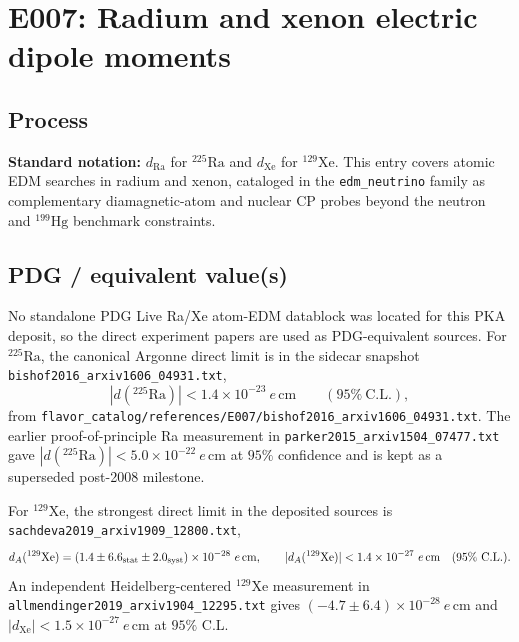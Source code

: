 
\section{E007: Radium and xenon electric dipole moments}

\subsection*{Process}
\textbf{Standard notation:} \(d_{\mathrm{Ra}}\) for
\(^{225}\mathrm{Ra}\) and \(d_{\mathrm{Xe}}\) for
\(^{129}\mathrm{Xe}\).  This entry covers atomic EDM searches in radium and
xenon, cataloged in the \texttt{edm\_neutrino} family as complementary
diamagnetic-atom and nuclear CP probes beyond the neutron and
\(^{199}\mathrm{Hg}\) benchmark constraints.

\subsection*{PDG / equivalent value(s)}
No standalone PDG Live Ra/Xe atom-EDM datablock was located for this PKA
deposit, so the direct experiment papers are used as PDG-equivalent sources.
For \(^{225}\mathrm{Ra}\), the canonical Argonne direct limit is in the
sidecar snapshot \texttt{bishof2016\_arxiv1606\_04931.txt},
\[
  |d(^{225}\mathrm{Ra})| < 1.4\times10^{-23}\ e\,\mathrm{cm}
  \qquad (95\%~\mathrm{C.L.}),
\]
from \texttt{flavor\_catalog/references/E007/bishof2016\_arxiv1606\_04931.txt}.
The earlier proof-of-principle Ra measurement in
\texttt{parker2015\_arxiv1504\_07477.txt} gave
\(|d(^{225}\mathrm{Ra})|<5.0\times10^{-22}\ e\,\mathrm{cm}\) at
\(95\%\) confidence and is kept as a superseded post-2008 milestone.

For \(^{129}\mathrm{Xe}\), the strongest direct limit in the deposited
sources is \texttt{sachdeva2019\_arxiv1909\_12800.txt},
\[
  d_A(^{129}\mathrm{Xe}) =
  (1.4 \pm 6.6_{\rm stat} \pm 2.0_{\rm syst})\times10^{-28}\ e\,\mathrm{cm},
  \qquad
  |d_A(^{129}\mathrm{Xe})| < 1.4\times10^{-27}\ e\,\mathrm{cm}
  \quad (95\%~\mathrm{C.L.}).
\]
An independent Heidelberg-centered \(^{129}\mathrm{Xe}\) measurement in
\texttt{allmendinger2019\_arxiv1904\_12295.txt} gives
\((-4.7\pm6.4)\times10^{-28}\ e\,\mathrm{cm}\) and
\(|d_{\mathrm{Xe}}|<1.5\times10^{-27}\ e\,\mathrm{cm}\) at
\(95\%\) C.L.

